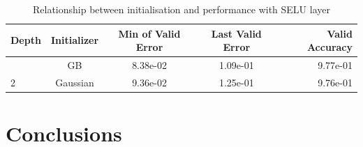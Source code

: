 \documentclass{article}
\begin{document}
\begin{table}[htb]
\vskip 3mm
\begin{center}
\begin{small}
\begin{sc}
\small
\begin{tabular}{lcccr}
\hline
\abovespace\belowspace
Depth & Initializer & Min of Valid Error & Last Valid Error & Valid Accuracy \\
\hline
\abovespace
2 &  GB & 8.38e-02 & 1.09e-01 & 9.77e-01\\
2 &  Gaussian & 9.36e-02 & 1.25e-01 & 9.76e-01\\
\hline
\end{tabular}
\end{sc}
\end{small}
\caption{Relationship between initialisation and performance with SELU layer}
\label{tab:sample-table}
\end{center}
\vskip -3mm
\end{table}





\section{Conclusions}
\label{sec:concl}
%
\end{document}

